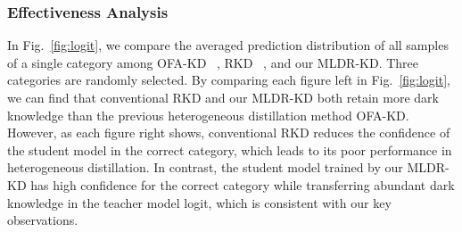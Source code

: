 \subsubsection{Effectiveness Analysis}
In Fig.~\ref{fig:logit}, we compare the averaged prediction distribution of all samples of a single category among OFA-KD ~\cite{hao2024one}, RKD
~\cite{park2019relational}, and our MLDR-KD. Three categories are randomly selected.
By comparing each figure left in Fig.~\ref{fig:logit}, we can find that conventional RKD and our MLDR-KD both retain more dark knowledge than the previous heterogeneous distillation method OFA-KD.
However, as each figure right shows, conventional RKD reduces the confidence of the student model in the correct category, which leads to its poor performance in heterogeneous distillation. 
In contrast, the student model trained by our MLDR-KD has high confidence for the correct category while transferring abundant dark knowledge in the teacher model logit, which is consistent with our key observations.